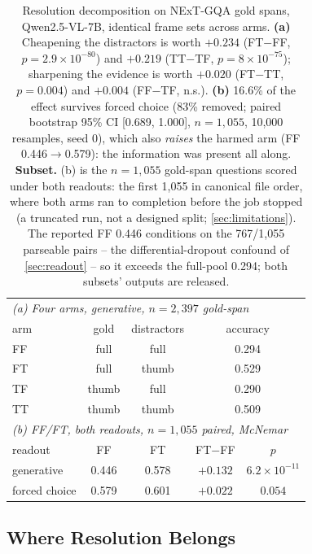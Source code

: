 \documentclass[10pt,twocolumn,letterpaper]{article}
\begin{document}
\begin{table}[t]
\centering
\footnotesize
\setlength{\tabcolsep}{4pt}
\begin{tabular}{lcccc}
\toprule
\multicolumn{5}{l}{\emph{(a) Four arms, generative, $n{=}2{,}397$ gold-span}}\\
arm & gold & distractors & \multicolumn{2}{c}{accuracy}\\
\midrule
FF & full & full & \multicolumn{2}{c}{0.294}\\
FT & full & thumb & \multicolumn{2}{c}{0.529}\\
TF & thumb & full & \multicolumn{2}{c}{0.290}\\
TT & thumb & thumb & \multicolumn{2}{c}{0.509}\\
\midrule
\multicolumn{5}{l}{\emph{(b) FF/FT, both readouts, $n{=}1{,}055$ paired, McNemar}}\\
readout & FF & FT & FT$-$FF & $p$\\
\midrule
generative & 0.446 & 0.578 & $\mathbf{+0.132}$ & $6.2{\times}10^{-11}$\\
forced choice & 0.579 & 0.601 & $+0.022$ & $0.054$\\
\bottomrule
\end{tabular}
\caption{Resolution decomposition on NExT-GQA gold spans, Qwen2.5-VL-7B, identical frame sets across arms. \textbf{(a)} Cheapening the distractors is worth $+0.234$ (FT$-$FF, $p{=}2.9{\times}10^{-80}$) and $+0.219$ (TT$-$TF, $p{=}8{\times}10^{-75}$); sharpening the evidence is worth $+0.020$ (FT$-$TT, $p{=}0.004$) and $+0.004$ (FF$-$TF, n.s.). \textbf{(b)} 16.6\% of the effect survives forced choice (83\% removed; paired bootstrap 95\% CI [0.689, 1.000], $n{=}1{,}055$, 10{,}000 resamples, seed 0), which also \emph{raises} the harmed arm (FF 0.446$\rightarrow$0.579): the information was present all along. \textbf{Subset.} (b) is the $n{=}1{,}055$ gold-span questions scored under both readouts: the first 1,055 in canonical file order, where both arms ran to completion before the job stopped (a truncated run, not a designed split; \cref{sec:limitations}). The reported FF 0.446 conditions on the 767/1,055 parseable pairs -- the differential-dropout confound of \cref{sec:readout} -- so it exceeds the full-pool 0.294; both subsets' outputs are released.}
\label{tab:decomp}
\end{table}

\subsection{Where Resolution Belongs}
\label{sec:decomp}
\end{document}
